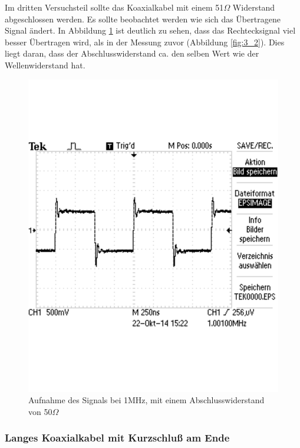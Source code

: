 \documentclass[12pt,a4paper]{article}
\begin{document}
Im dritten Versuchsteil sollte das Koaxialkabel mit einem 51$\Omega$ Widerstand abgeschlossen werden. Es sollte beobachtet werden wie sich das Übertragene Signal ändert. In Abbildung \ref{fig:3_3} ist deutlich zu sehen, dass das Rechtecksignal viel besser Übertragen wird, als in der Messung zuvor (Abbildung \ref{fig:3_2}). Dies liegt daran, dass der Abschlusswiderstand ca. den selben Wert wie der Wellenwiderstand hat.

\begin{figure}[H] 
  \centering
    \includegraphics[scale = 0.5]{3_3.pdf}
  	\caption[Aufnahme des Signals bei 1MHz, mit einem Abschlusswiderstand von 50$\Omega$]{Aufnahme des Signals bei 1MHz, mit einem Abschlusswiderstand von 50$\Omega$}
  \label{fig:3_3}
\end{figure}

\subsubsection{Langes Koaxialkabel mit Kurzschluß am Ende}
\end{document}
